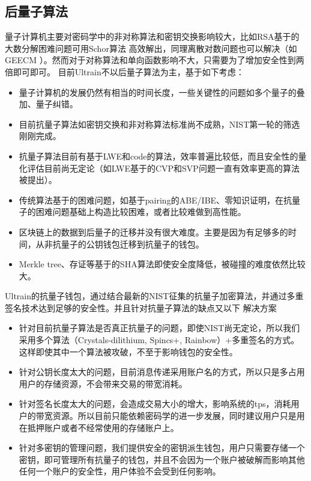 \documentclass[12pt, UTF8]{article}
\begin{document}
\subsection{后量子算法}
量子计算机主要对密码学中的非对称算法和密钥交换影响较大，比如RSA基于的大数分解困难问题可用Schor算法 高效解出，同理离散对数问题也可以解决（如GEECM ）。然而对于对称算法和单向函数影响不大，只需要为了增加安全性到两倍即可即可。
目前Ultrain不以后量子算法为主，基于如下考虑：
\begin{itemize}
\item 量子计算机的发展仍然有相当的时间长度\cite{aaronson2008limits}，一些关键性的问题如多个量子的叠加、量子纠错。
\item 目前抗量子算法如密钥交换和非对称算法标准尚不成熟，NIST第一轮的筛选刚刚完成。
\item 抗量子算法目前有基于LWE\cite{alkim2016post}和code\cite{cayrel2010post}的算法，效率普遍比较低，而且安全性的量化评估目前尚无定论（如LWE基于的CVP和SVP问题一直有效率更高的算法被提出\cite{lindner2011better}）。
\item 传统算法基于的困难问题，如基于pairing的ABE\cite{waters2011ciphertext}/IBE\cite{boneh2003identity}、零知识证明\cite{parno2013pinocchio}，在抗量子的困难问题基础上构造比较困难，或者比较难做到高性能。
\item 区块链上的数据到后量子的迁移并没有很大难度。主要是因为有足够多的时间，从非抗量子的公钥钱包迁移到抗量子的钱包。
\item Merkle tree、存证等基于的SHA算法即使安全度降低，被碰撞的难度依然比较大。
\end{itemize}

Ultrain的抗量子钱包，通过结合最新的NIST征集的抗量子加密算法，并通过多重签名技术达到足够的安全性。并且针对抗量子算法的缺点又以下 解决方案
\begin{itemize}
\item 针对目前抗量子算法是否真正抗量子的问题，即使NIST尚无定论，所以我们采用多个算法（Crystals-dilithium, Spincs+, Rainbow）+多重签名的方式。这样即使其中一个算法被攻破，不至于影响钱包的安全性。
\item 针对公钥长度太大的问题，目前消息传递采用账户名的方式，所以只是多占用用户的存储资源，不会带来交易的带宽消耗。
\item 针对签名长度太大的问题，会造成交易大小的增大，影响系统的tps，消耗用户的带宽资源。所以目前只能依赖密码学的进一步发展，同时建议用户只是用在抵押账户或者不经常使用的存储账户上。
\item 针对多密钥的管理问题，我们提供安全的密钥派生钱包，用户只需要存储一个密钥，即可管理所有抗量子的钱包，并且不会因为一个账户被破解而影响其他任何一个账户的安全性，用户体验不会受到任何影响。
\end{itemize}
\end{document}
